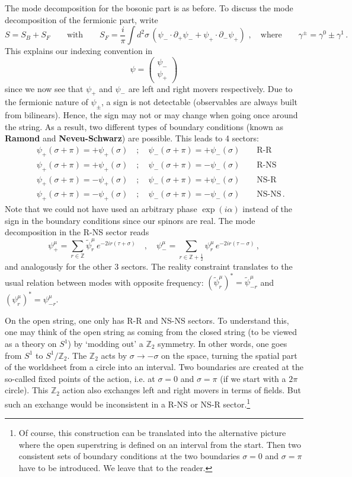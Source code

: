 \documentclass[12pt]{article}
\newcommand{\be}{\begin{equation}}
\newcommand{\ee}{\end{equation}}
\newcommand{\bea}{\begin{eqnarray}}
\newcommand{\eea}{\end{eqnarray}}
\numberwithin{equation}{section}
\begin{document}
The mode decomposition for the bosonic part is as before. To discuss the mode decomposition of the fermionic part, write
\be
S=S_B+S_F\qquad \mbox{with}\qquad S_F=\frac{i}{\pi}\int d^2\sigma\,(\psi_-\cdot \partial_+\psi_-+\psi_+\cdot\partial_-\psi_+)\,\,,\quad\mbox{where}\qquad
\gamma^\pm=\gamma^0\pm\gamma^1\,.
\ee
This explains our indexing convention in
\be
\psi=\left(\begin{array}{c}\psi_-\\ \psi_+\end{array}\right)
\ee
since we now see that $\psi_+$ and $\psi_-$ are left and right movers respectively. Due to the fermionic nature of $\psi_{\pm}$, a sign is not detectable (observables are always built from bilinears). Hence, the sign may not or may change when going once around the string. As a result, two different types of boundary conditions (known as {\bf Ramond} and {\bf Neveu-Schwarz}) are possible. This leads to 4 sectors:
\bea
&&\psi_+(\sigma+\pi)=+\psi_+(\sigma)\quad;\quad \psi_-(\sigma+\pi)=+\psi_-(\sigma) \qquad \mbox{R-R}
\nonumber \\
&&\psi_+(\sigma+\pi)=+\psi_+(\sigma)\quad;\quad \psi_-(\sigma+\pi)=-\psi_-(\sigma) \qquad \mbox{R-NS}
\nonumber \\
&&\psi_+(\sigma+\pi)=-\psi_+(\sigma)\quad;\quad \psi_-(\sigma+\pi)=+\psi_-(\sigma) \qquad \mbox{NS-R}
\nonumber \\
&&\psi_+(\sigma+\pi)=-\psi_+(\sigma)\quad;\quad \psi_-(\sigma+\pi)=-\psi_-(\sigma) \qquad \mbox{NS-NS}\,.
\eea
Note that we could not have used an arbitrary phase $\exp(i\alpha)$ instead of the sign in the boundary conditions since our spinors are real. The mode decomposition in the R-NS sector reads
\be
\psi_+^\mu=\sum_{r\in\mathbb{Z}}\tilde{\psi}_r^\mu\,e^{-2ir(\tau+\sigma)} \quad,\quad \psi_-^\mu=\sum_{r\in\mathbb{Z}+\frac{1}{2}}\psi_r^\mu\,e^{-2ir(\tau -\sigma)}\,,
\ee
and analogously for the other 3 sectors. The reality constraint translates to the usual relation between modes with opposite frequency: $(\tilde{\psi}_r^\mu)^* = \tilde{\psi}_{-r}^\mu$ and $(\psi_r^\mu)^* = \psi_{-r}^\mu$.

On the open string, one only has R-R and NS-NS sectors. To understand this, one may think of the open string as coming from the closed string (to be viewed as a theory on $S^1$) by `modding out' a $\mathbb{Z}_2$ symmetry. In other words, one goes from $S^1$ to $S^1/\mathbb{Z}_2$. The $\mathbb{Z}_2$ acts by $\sigma\to -\sigma$ on the space, turning the spatial part of the worldsheet from a circle into an interval. Two boundaries are created at the so-called fixed points of the action, i.e. at $\sigma=0$ and $\sigma=\pi$ (if we start with a $2\pi$ circle). This $\mathbb{Z}_2$ action also exchanges left and right movers in terms of fields. But such an exchange would be inconsistent in a R-NS or NS-R sector.\footnote{Of course, this construction can be translated into the alternative picture where the open superstring is defined on an interval from the start. Then two consistent sets of boundary conditions at the two boundaries $\sigma=0$ and $\sigma=\pi$ have to be introduced. We leave that to the reader.}
\end{document}
